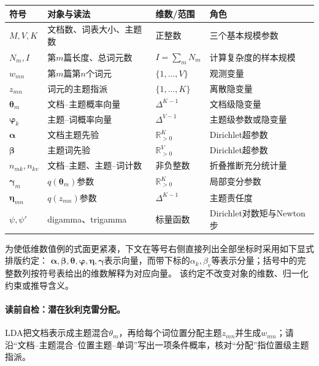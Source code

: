 \begin{symboltablebox}
\small
\begin{longtable}{@{}p{}p{}p{}p{}@{}}
\toprule
符号 & 对象与读法 & 维数/范围 & 角色 \\
\midrule
$M,V,K$ & 文档数、词表大小、主题数 & 正整数 & 三个基本规模参数 \\
$N_m,I$ & 第$m$篇长度、总词元数 & $I=\sum_mN_m$ & 计算复杂度的样本规模 \\
$w_{mn}$ & 第$m$篇第$n$个词元 & $\{1,\ldots,V\}$ & 观测变量 \\
$z_{mn}$ & 词元的主题指派 & $\{1,\ldots,K\}$ & 离散隐变量 \\
$\boldsymbol\theta_m$ & 文档--主题概率向量 & $\Delta^{K-1}$ & 文档级隐变量 \\
$\boldsymbol\varphi_k$ & 主题--词概率向量 & $\Delta^{V-1}$ & 主题级参数或隐变量 \\
$\boldsymbol\alpha$ & 文档主题先验 & $\mathbb R_{>0}^{K}$ & Dirichlet超参数 \\
$\boldsymbol\beta$ & 主题词先验 & $\mathbb R_{>0}^{V}$ & Dirichlet超参数 \\
$n_{mk},n_{kv}$ & 文档--主题、主题--词计数 & 非负整数 & 折叠推断充分统计量 \\
$\boldsymbol\gamma_m$ & $q(\boldsymbol\theta_m)$参数 & $\mathbb R_{>0}^{K}$ & 局部变分参数 \\
$\boldsymbol\eta_{mn}$ & $q(z_{mn})$参数 & $\Delta^{K-1}$ & 主题责任度 \\
$\psi,\psi'$ & digamma、trigamma & 标量函数 & Dirichlet对数矩与Newton步 \\
\bottomrule
\end{longtable}
为使低维数值例的式面更紧凑，下文在等号右侧直接列出全部坐标时采用如下显式排版约定：
$\boldsymbol\alpha,\boldsymbol\beta,\boldsymbol\theta,\boldsymbol\varphi,
\boldsymbol\eta,\boldsymbol\gamma$表示向量，而带下标的$\alpha_k,\beta_v$等表示分量；括号中的完整数列按符号表给出的维数解释为对应向量。
该约定不改变对象的维数、归一化约束或推导含义。
\end{symboltablebox}

\paragraph{读前自检：潜在狄利克雷分配。}LDA把文档表示成主题混合$\theta_m$，再给每个词位置分配主题$z_{mn}$并生成$w_{mn}$；请沿“文档--主题混合--位置主题--单词”写出一项条件概率，核对“分配”指位置级主题指派。\par
